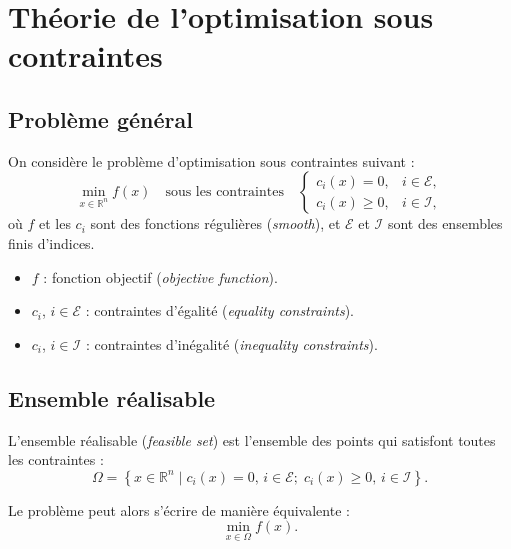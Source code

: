 \chapter{Théorie de l'optimisation sous contraintes}
\label{chap:constrained-optimization}

\section{Problème général}

On considère le problème d'optimisation sous contraintes suivant :
\begin{equation}
    \min_{x \in \mathbb{R}^n} f(x) \quad \text{sous les contraintes} \quad
    \begin{cases}
        c_i(x) = 0, & i \in \mathcal{E}, \\
        c_i(x) \geq 0, & i \in \mathcal{I},
    \end{cases}
\end{equation}
où $f$ et les $c_i$ sont des fonctions régulières (\textit{smooth}), et $\mathcal{E}$ et $\mathcal{I}$ sont des ensembles finis d'indices.

\begin{itemize}
    \item $f$ : fonction objectif (\textit{objective function}).
    \item $c_i$, $i \in \mathcal{E}$ : contraintes d'égalité (\textit{equality constraints}).
    \item $c_i$, $i \in \mathcal{I}$ : contraintes d'inégalité (\textit{inequality constraints}).
\end{itemize}

\section{Ensemble réalisable}

\begin{definition}
L'ensemble réalisable (\textit{feasible set}) est l'ensemble des points qui satisfont toutes les contraintes :
\begin{equation}
    \Omega = \left\{ x \in \mathbb{R}^n \mid c_i(x) = 0, \, i \in \mathcal{E} ; \; c_i(x) \geq 0, \, i \in \mathcal{I} \right\}.
\end{equation}
\end{definition}

Le problème peut alors s'écrire de manière équivalente :
\begin{equation}
    \min_{x \in \Omega} f(x).
\end{equation}

